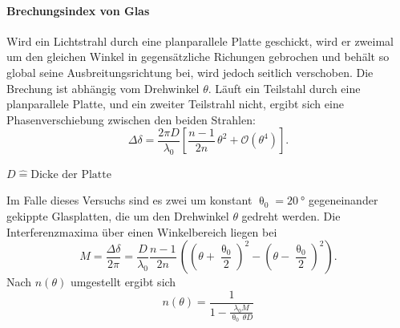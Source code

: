 \paragraph{Brechungsindex von Glas}
Wird ein Lichtstrahl durch eine planparallele Platte geschickt, wird er zweimal um den gleichen Winkel in gegensätzliche Richungen gebrochen und behält so global seine Ausbreitungsrichtung bei, wird jedoch seitlich verschoben.
Die Brechung ist abhängig vom Drehwinkel $\theta$.
Läuft ein Teilstahl durch eine planparallele Platte, und ein zweiter Teilstrahl nicht, ergibt sich eine Phasenverschiebung zwischen den beiden Strahlen:
\begin{equation*}
	\Delta \delta = \frac{2 \pi D}{\lambda_0} \left[ \frac{n-1}{2n} \, \theta^2 + \mathcal{O}(\theta^4) \right].
\end{equation*}
\begin{center}
	\tiny{$D \widehat{=} \text{Dicke der Platte}$}
\end{center}
Im Falle dieses Versuchs sind es zwei um konstant $\uptheta_0 = \SI{20}{°}$ gegeneinander gekippte Glasplatten, die um den Drehwinkel $\theta$ gedreht werden.
Die Interferenzmaxima über einen Winkelbereich liegen bei
\begin{equation*}
	M = \frac{\Delta \delta}{2 \pi} = \frac{D}{\lambda_{0}} \frac{n-1}{2n} \,  \left( (\theta+\frac{\uptheta_0}{2})^2 - (\theta-\frac{\uptheta_0}{2})^2 \right).
\end{equation*}
Nach $n(\theta)$ umgestellt ergibt sich
\begin{equation}
	n (\theta) = \frac{1}{1- \frac{\lambda_0 M}{ \uptheta_0 \, \theta D}} \label{eqn:brechungsindex_glas}
\end{equation}
\FloatBarrier
